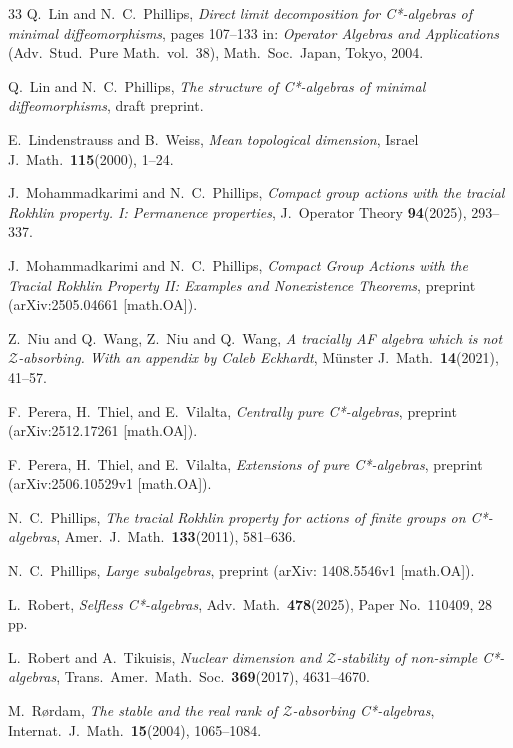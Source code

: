 \documentclass[10pt]{amsart}
\numberwithin{equation}{section}
\theoremstyle{definition}
\begin{document}
\begin{thebibliography}{33}
Q.~Lin and N.~C.\  Phillips,
{\emph{Direct limit decomposition for C*-algebras
of minimal diffeomorphisms}},
pages 107--133 in:
{\emph{Operator Algebras and Applications}}
(Adv.\  Stud.\  Pure Math.\  vol.~38),
Math.\  Soc.\  Japan, Tokyo, 2004.

Q.~Lin and N.~C.\  Phillips,
{\emph{The structure of C*-algebras of minimal diffeomorphisms}},
draft preprint.

E.~Lindenstrauss and B.~Weiss,
{\emph{Mean topological dimension}},
Israel J.\  Math.\  {\textbf{115}}(2000), 1--24.

J.~Mohammadkarimi and N.~C.\  Phillips,
{\emph{Compact group actions with the tracial Rokhlin property.
 I: Permanence properties}},
J.~Operator Theory {\textbf{94}}(2025), 293--337.

J.~Mohammadkarimi and N.~C.~Phillips,
{\emph{Compact Group Actions with the Tracial Rokhlin Property II:
 Examples and Nonexistence Theorems}},
preprint (arXiv:2505.04661 [math.OA]).

 Z.~Niu and Q.~Wang,
Z.~Niu and Q.~Wang,
{\emph{A tracially AF algebra which is not ${\mathcal{Z}}$-absorbing.
 With an appendix by Caleb Eckhardt}},
M\"{u}nster J.\  Math.\  {\textbf{14}}(2021), 41--57.

F.~Perera, H.~Thiel, and E.~Vilalta,
{\emph{Centrally pure C*-algebras}},
preprint (arXiv:2512.17261 [math.OA]).

F.~Perera, H.~Thiel, and E.~Vilalta,
{\emph{Extensions of pure C*-algebras}},
preprint (arXiv:2506.10529v1 [math.OA]).

N.~C.\  Phillips,
{\emph{The tracial Rokhlin property
     for actions of finite groups on C*-algebras}},
Amer.\  J.\  Math.\  {\textbf{133}}(2011), 581--636.

N.~C.\  Phillips,
{\emph{Large subalgebras}},
preprint (arXiv: 1408.5546v1 [math.OA]).

L.~Robert, {\emph{Selfless C*-algebras}},
Adv.\  Math.\  {\textbf{478}}(2025), Paper No.\  110409, 28 pp.

L.~Robert and A.~Tikuisis,
{\emph{Nuclear dimension and $\mathcal{Z}$-stability of non-simple
  C*-algebras}},
Trans.\  Amer.\  Math.\  Soc.\  {\textbf{369}}(2017), 4631--4670.

M.~R{\o}rdam,
{\emph{The stable and the real rank of ${\mathcal{Z}}$-absorbing
 C*-algebras}},
Internat.\  J.\  Math.\  {\textbf{15}}(2004), 1065--1084.


\end{thebibliography}
\end{document}
